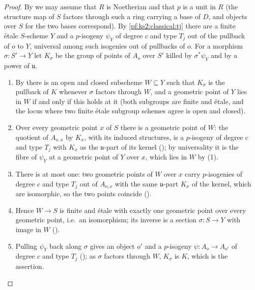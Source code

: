 \begin{proof}
By  we may assume that $R$ is Noetherian and that
$p$ is a unit in $R$ (the structure map of $S$ factors through such a ring carrying a base of $D$, and
objects over $S$ for the two bases correspond). By \cref{pf:ks2:classical:tj} there are a finite
\'etale $S$-scheme $Y$ and a $p$-isogeny $\psi_Y$ of degree $c$ and type $T_j$ out of the pullback of
$o$ to $Y$, universal among such isogenies out of pullbacks of $o$. For a morphism $\sigma\colon
S'\to Y$ let $K_\sigma$ be the group of points of $A_o$ over $S'$ killed by $\sigma^*\psi_Y$ and by a
power of $\mathfrak u$.
\begin{enumerate}
\item By  there is an open and closed subscheme
  $W\subseteq Y$ such that $K_\sigma$ is the pullback of $K$ whenever $\sigma$ factors through $W$, and
  a geometric point of $Y$ lies in $W$ if and only if this holds at it (both subgroups are finite and
  \'etale, and the locus where two finite \'etale subgroup schemes agree is open and closed).
\item Over every geometric point $x$ of $S$ there is a geometric point of $W$: the quotient of
  $A_{o,x}$ by $K_x$, with its induced structures, is a $p$-isogeny of degree $c$ and type $T_j$ with
  $K_x$ as the $\mathfrak u$-part of its kernel
  (); by universality it is the fibre of
  $\psi_Y$ at a geometric point of $Y$ over $x$, which lies in $W$ by (1).
\item There is at most one: two geometric points of $W$ over $x$ carry $p$-isogenies of degree $c$
  and type $T_j$ out of $A_{o,x}$ with the same $\mathfrak u$-part $K_x$ of the kernel, which are
  isomorphic, so the two points coincide
  ().
\item Hence $W\to S$ is finite and \'etale with exactly one geometric point over every geometric
  point, i.e.\ an isomorphism; its inverse is a section $\sigma\colon S\to Y$ with image in $W$
  ().
\item Pulling $\psi_Y$ back along $\sigma$ gives an object $o'$ and a $p$-isogeny $\psi\colon
  A_o\to A_{o'}$ of degree $c$ and type $T_j$
  (); as $\sigma$ factors through $W$,
  $K_\sigma$ is $K$, which is the assertion.
\end{enumerate}
\end{proof}


